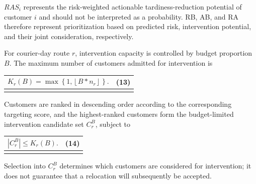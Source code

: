 \documentclass[
]{article}
\newcounter{none} %
\begin{document}
\(RAS_{i}\) represents the risk-weighted actionable tardiness-reduction
potential of customer \(i\) and should not be interpreted as a
probability. RB, AB, and RA therefore represent prioritization based on
predicted risk, intervention potential, and their joint consideration,
respectively.

For courier-day route \(r\), intervention capacity is controlled by
budget proportion \(B\). The maximum number of customers admitted for
intervention is

{\def\LTcaptype{none} %
\begin{longtable}[]{@{}
  >{\raggedright\arraybackslash}p{}
  >{\raggedright\arraybackslash}p{}@{}}
\toprule\noalign{}
\begin{minipage}[b]{\linewidth}\raggedright
\[K_{r}(B) = \max\left\{ 1,\left\lfloor B*n_{r} \right\rfloor \right\}.\]
\end{minipage} & \begin{minipage}[b]{\linewidth}\raggedleft
(13)
\end{minipage} \\
\midrule\noalign{}
\endhead
\bottomrule\noalign{}
\endlastfoot
\end{longtable}
}

Customers are ranked in descending order according to the corresponding
targeting score, and the highest-ranked customers form the
budget-limited intervention candidate set \(C_{r}^{B}\), subject to

{\def\LTcaptype{none} %
\begin{longtable}[]{@{}
  >{\raggedright\arraybackslash}p{}
  >{\raggedright\arraybackslash}p{}@{}}
\toprule\noalign{}
\begin{minipage}[b]{\linewidth}\raggedright
\[\left| C_{r}^{B} \right| \leq K_{r}(B).\]
\end{minipage} & \begin{minipage}[b]{\linewidth}\raggedleft
(14)
\end{minipage} \\
\midrule\noalign{}
\endhead
\bottomrule\noalign{}
\endlastfoot
\end{longtable}
}

Selection into \(C_{r}^{B}\) determines which customers are considered
for intervention; it does not guarantee that a relocation will
subsequently be accepted.
\end{document}
